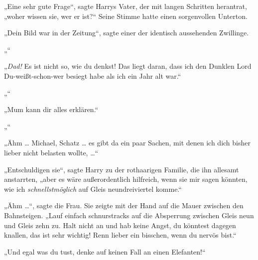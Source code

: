 „Eine sehr gute Frage“, sagte Harrys Vater, der mit langen Schritten herantrat, „woher wissen sie, wer er ist?“ Seine Stimme hatte einen sorgenvollen Unterton.

„Dein Bild war in der Zeitung“, sagte einer der identisch aussehenden Zwillinge.

„“

„\emph{Dad!} Es ist nicht so, wie du denkst! Das liegt daran, dass ich den Dunklen Lord Du-weißt-schon-wer besiegt habe als ich ein Jahr alt war.“

„“

„Mum kann dir alles erklären.“

„“

„Ähm … Michael, Schatz … es gibt da ein paar Sachen, mit denen ich dich bisher lieber nicht belasten wollte, …“

„Entschuldigen sie“, sagte Harry zu der rothaarigen Familie, die ihn allesamt anstarrten, „aber es wäre außerordentlich hilfreich, wenn sie mir sagen könnten, wie ich \emph{schnellstmöglich} auf Gleis neundreiviertel komme.“

„Ähm …“, sagte die Frau. Sie zeigte mit der Hand auf die Mauer zwischen den Bahnsteigen.
„Lauf einfach schnurstracks auf die Absperrung zwischen Gleis neun und Gleis zehn zu. Halt nicht an und hab keine Angst, du könntest dagegen knallen, das ist sehr wichtig! Renn lieber ein bisschen, wenn du nervös bist.“

„Und egal was du tust, denke auf keinen Fall an einen Elefanten!“

